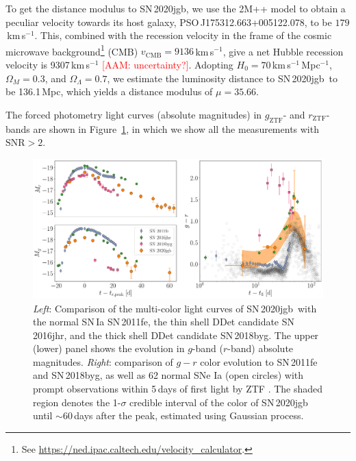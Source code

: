 \documentclass[twocolumn]{aastex631}
\newcommand{\sn}{SN\,2020jgb}
\newcommand{\adam}[1]{\textcolor{red}{[AAM: #1]}}
\begin{document}
To get the distance modulus to \sn, we use the 2M++ model \citep{Carrick2015_2M++} to obtain a peculiar velocity towards its host galaxy, PSO\,J175312.663+005122.078, to be $179$\,km\,s$^{-1}$. This, combined with the recession velocity in the frame of the cosmic microwave background\footnote{See \url{https://ned.ipac.caltech.edu/velocity_calculator}.} (CMB) $v_\mathrm{CMB}=9136$\,km\,s$^{-1}$, give a net Hubble recession velocity is 9307\,km\,s$^{-1}$ \adam{uncertainty?}. Adopting $H_0=70$\,km\,s$^{-1}$\,Mpc$^{-1}$, $\Omega_M=0.3$, and $\Omega_\Lambda=0.7$, we estimate the luminosity distance to \sn\ to be 136.1\,Mpc, which yields a distance modulus of $\mu=35.66$.

The forced photometry light curves (absolute magnitudes) in $g_\mathrm{ZTF}$- and $r_\mathrm{ZTF}$-bands are shown in Figure~\ref{fig:photometry}, in which we show all the measurements with $\mathrm{SNR}>2$.

\begin{figure}
    \centering
    \includegraphics[width=\textwidth]{photometry.pdf}
    \caption{\textit{Left}: Comparison of the multi-color light curves  of \sn\ with the normal SN\,Ia SN\,2011fe, the thin shell DDet candidate SN\,2016jhr, and the thick shell DDet candidate SN\,2018byg. The upper (lower) panel shows the evolution in $g$-band ($r$-band) absolute magnitudes. \textit{Right}: comparison of $g-r$ color evolution to SN\,2011fe and SN\,2018byg, as well as 62 normal SNe Ia (open circles) with prompt observations within 5\,days of first light by ZTF \citep{Bulla2020}. The shaded region denotes the 1-$\sigma$ credible interval of the color of SN\,2020jgb until $\sim$60\,days after the peak, estimated using Gaussian process.}
    \label{fig:photometry}
\end{figure}
\end{document}
